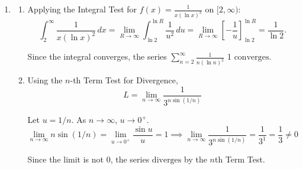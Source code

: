 \documentclass[a4paper, 12pt]{article}
\begin{document}
\begin{enumerate}[leftmargin=*,label=\textbf{\arabic*.}]
\begin{enumerate}[leftmargin=*,label=\textbf{\alph*.}]
At $x = 5$: $\sum_{n=1}^{\infty} \frac{(-1)^n 2^n}{2^n \cdot n} = \sum_{n=1}^{\infty} \frac{(-1)^n}{n}$, which converges by the Alternating Series Test.

Therefore, the interval of convergence is $\boxed{(1, 5]}$.

\item \begin{enumerate}[leftmargin=*,label=\textbf{\roman*.}]
\item Applying the Integral Test for $f(x) = \frac{1}{x(\ln x)^2}$ on $[2, \infty)$:
\[\int_{2}^{\infty} \frac{1}{x(\ln x)^2} \, dx = \lim_{R \to \infty} \int_{\ln 2}^{\ln R} \frac{1}{u^2} \, du = \lim_{R \to \infty} \left[ -\frac{1}{u} \right]_{\ln 2}^{\ln R} = \frac{1}{\ln 2}.\]

Since the integral converges, the series $\sum_{n=2}^{\infty} \frac{1}{n(\ln n)^2}$ 1 $\boxed{\text{converges}}$.

\item Using the $n$-th Term Test for Divergence,
\[L = \lim_{n \to \infty} \frac{1}{3^{n \sin(1/n)}}\]

Let $u = 1/n$. As $n \to \infty$, $u \to 0^+$.
\[\lim_{n \to \infty} n \sin(1/n) = \lim_{u \to 0^+} \frac{\sin u}{u} = 1\implies \lim_{n \to \infty} \frac{1}{3^{n \sin(1/n)}} = \frac{1}{3^1} = \frac{1}{3} \ne 0\]

Since the limit is not 0, the series $\boxed{\text{diverges}}$ by the $n$th Term Test.
\end{enumerate}
\end{enumerate}
\end{enumerate}
\end{document}
